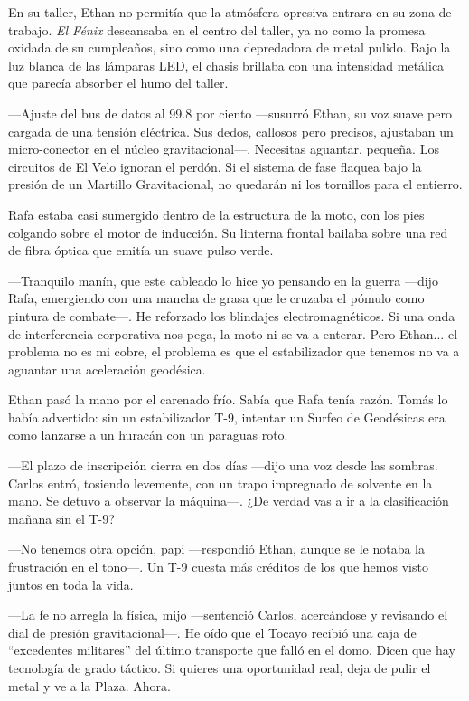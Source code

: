 \documentclass[11pt,twoside]{book}
\begin{document}
En su taller, Ethan no permitía que la atmósfera opresiva entrara en su zona de trabajo. \textit{El Fénix} descansaba en el centro del taller, ya no como la promesa oxidada de su cumpleaños, sino como una depredadora de metal pulido. Bajo la luz blanca de las lámparas LED, el chasis brillaba con una intensidad metálica que parecía absorber el humo del taller.

---Ajuste del bus de datos al 99.8 por ciento ---susurró Ethan, su voz suave pero cargada de una tensión eléctrica. Sus dedos, callosos pero precisos, ajustaban un micro-conector en el núcleo gravitacional---. Necesitas aguantar, pequeña. Los circuitos de El Velo ignoran el perdón. Si el sistema de fase flaquea bajo la presión de un Martillo Gravitacional, no quedarán ni los tornillos para el entierro.

Rafa estaba casi sumergido dentro de la estructura de la moto, con los pies colgando sobre el motor de inducción. Su linterna frontal bailaba sobre una red de fibra óptica que emitía un suave pulso verde.

---Tranquilo manín, que este cableado lo hice yo pensando en la guerra ---dijo Rafa, emergiendo con una mancha de grasa que le cruzaba el pómulo como pintura de combate---. He reforzado los blindajes electromagnéticos. Si una onda de interferencia corporativa nos pega, la moto ni se va a enterar. Pero Ethan... el problema no es mi cobre, el problema es que el estabilizador que tenemos no va a aguantar una aceleración geodésica.

Ethan pasó la mano por el carenado frío. Sabía que Rafa tenía razón. Tomás lo había advertido: sin un estabilizador T-9, intentar un Surfeo de Geodésicas era como lanzarse a un huracán con un paraguas roto.

---El plazo de inscripción cierra en dos días ---dijo una voz desde las sombras. Carlos entró, tosiendo levemente, con un trapo impregnado de solvente en la mano. Se detuvo a observar la máquina---. ¿De verdad vas a ir a la clasificación mañana sin el T-9?

---No tenemos otra opción, papi ---respondió Ethan, aunque se le notaba la frustración en el tono---. Un T-9 cuesta más créditos de los que hemos visto juntos en toda la vida.

---La fe no arregla la física, mijo ---sentenció Carlos, acercándose y revisando el dial de presión gravitacional---. He oído que el Tocayo recibió una caja de ``excedentes militares'' del último transporte que falló en el domo. Dicen que hay tecnología de grado táctico. Si quieres una oportunidad real, deja de pulir el metal y ve a la Plaza. Ahora.
\end{document}
